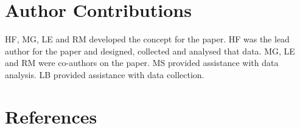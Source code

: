 \documentclass[
  english,
  man]{apa6}
\begin{document}
\hypertarget{author-contributions}{%
\section{Author Contributions}\label{author-contributions}}

HF, MG, LE and RM developed the concept for the paper. HF was the lead author for the paper and designed, collected and analysed that data. MG, LE and RM were co-authors on the paper. MS provided assistance with data analysis. LB provided assistance with data collection.

\hypertarget{references}{%
\section{References}\label{references}}

\begingroup
\setlength{\parindent}{-0.5in}
\setlength{\leftskip}{0.5in}
\end{document}
